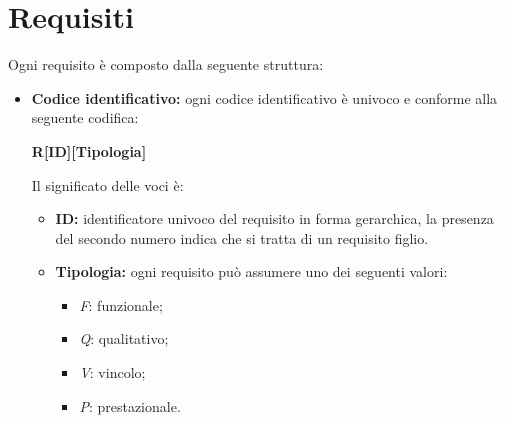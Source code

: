 \section{Requisiti}
Ogni requisito è composto dalla seguente struttura:
\begin{itemize}
    \item \textbf{Codice identificativo:} ogni codice identificativo è univoco e conforme alla seguente codifica:
          \begin{center}
              \textbf{R[ID][Tipologia]}
          \end{center}
          Il significato delle voci è:
          \begin{itemize}
              \item \textbf{ID:} identificatore univoco del requisito in forma gerarchica, la presenza del secondo numero indica che si tratta di un requisito figlio.
              \item \textbf{Tipologia:} ogni requisito può assumere uno dei seguenti valori:
                    \begin{itemize}
                        \item \textit{F}: funzionale;
                        \item \textit{Q}: qualitativo;
                        \item \textit{V}: vincolo;
                        \item \textit{P}: prestazionale.
                    \end{itemize}
          \end{itemize}


\end{itemize}
